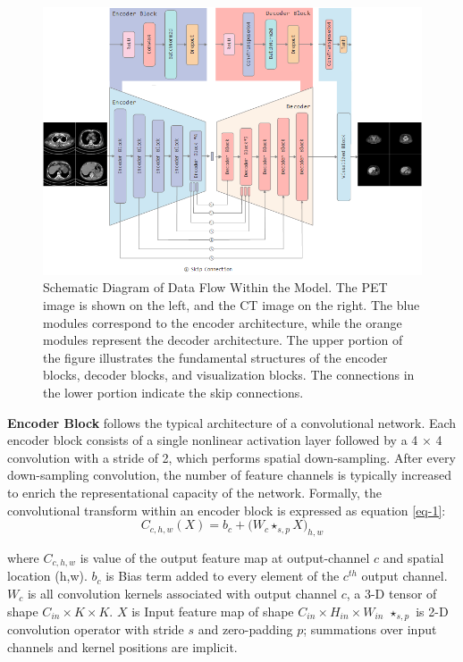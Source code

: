 \documentclass[a4paper, times, 10pt,twocolumn]{article}
\begin{document}
\begin{figure}[t!]
	\centering
	\includegraphics[width=1.0\linewidth]{u-net/lung/Encoder-Decoder-5layer-250406}
	\caption[architecture]{Schematic Diagram of Data Flow Within the Model. The PET image is shown on the left, and the CT image on the right. The blue modules correspond to the encoder architecture, while the orange modules represent the decoder architecture. The upper portion of the figure illustrates the fundamental structures of the encoder blocks, decoder blocks, and visualization blocks. The connections in the lower portion indicate the skip connections.}
	\label{fig:Encoder_Decoder_Pair}
\end{figure}

\textbf{Encoder Block} follows the typical architecture of a convolutional network.
Each encoder block consists of a single nonlinear activation layer followed by a 4 × 4 convolution with a stride of 2, which performs spatial down-sampling. After every down-sampling convolution, the number of feature channels is typically increased to enrich the representational capacity of the network. Formally, the convolutional transform within an encoder block is expressed as equation \eqref{eq-1}:
\begin{equation}
	\label{eq-1}
	C_{c,h,w}(X)= b_{c} + \bigl(W_{c} \star_{s,p} X\bigr)_{h,w}
\end{equation}

where
$C_{c,h,w}$ is value of the output feature map at output-channel $c$ and spatial location (h,w).
$b_c$ is Bias term added to every element of the $c^{th}$ output channel.
$W_c$ is all convolution kernels associated with output channel $c$, a 3-D tensor of shape $C_{in} \times K \times K$.
$X$ is Input feature map of shape $C_{in} \times H_{in} \times W_{in}$
$\star_{s,p}$ is 2-D convolution operator with stride $s$ and zero-padding $p$; summations over input channels and kernel positions are implicit.
\end{document}
